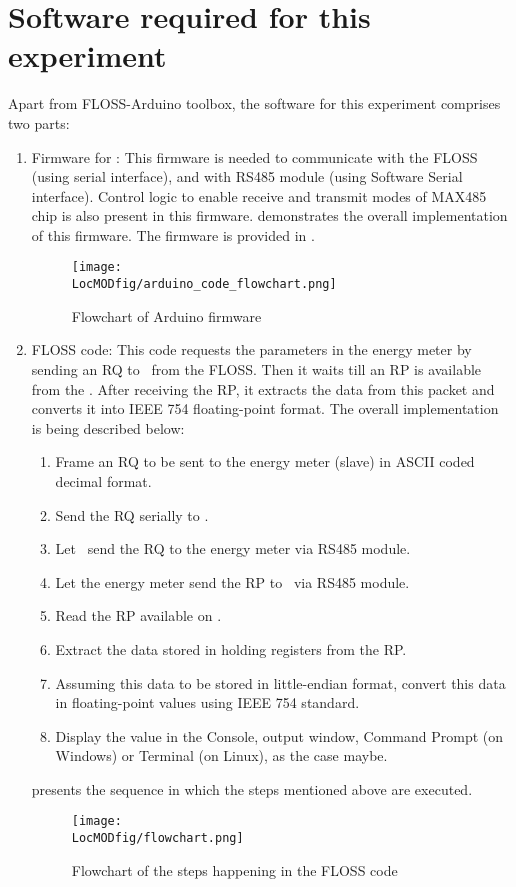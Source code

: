 \section{Software required for this experiment}
Apart from FLOSS-Arduino toolbox, the software for this experiment comprises two parts:
\begin{enumerate}
\item  Firmware for \arduino: This firmware is needed to communicate
with the FLOSS (using serial interface), and with RS485 module (using
Software Serial interface). Control logic to enable receive and
transmit modes of MAX485 chip is also present in this firmware.  demonstrates the overall implementation of this firmware. The firmware is provided in .

\begin{figure}
  \centering
  \texttt{[image: \\LocMODfig/arduino\_code\_flowchart.png]}
  \caption{Flowchart of Arduino firmware}
  \label{fig:modbus-firmware}
\end{figure}

\item FLOSS code: This code requests the parameters in the energy meter
by sending an RQ to \arduino\ from the FLOSS. Then it waits till
an RP is available from the \arduino. After receiving the RP, it extracts
the data from this packet and converts it into IEEE
754 floating-point format. The overall implementation is being
described below:
\begin {enumerate}
  \item Frame an RQ to be sent to the energy meter (slave) in ASCII coded decimal
  format.
  \item Send the RQ serially to \arduino.
  \item Let \arduino\ send the RQ to the energy meter via RS485 module.
  \item Let the energy meter send the RP to \arduino\ via RS485 module.
  \item Read the RP available on \arduino.
  \item Extract the data stored in holding registers from the RP.
  \item Assuming this data to be stored in little-endian format,
  convert this data in floating-point values using IEEE 754 standard.
  \item Display the value in the Console, output window, Command Prompt (on Windows) or Terminal (on Linux), as the case maybe.
\end{enumerate}
 presents the sequence in which the steps mentioned above are executed.
\begin{figure}
  \centering
  \texttt{[image: \\LocMODfig/flowchart.png]}
  \caption{Flowchart of the steps happening in the FLOSS code}
  \label{fig:flow-chart}
\end{figure}

\end{enumerate}


